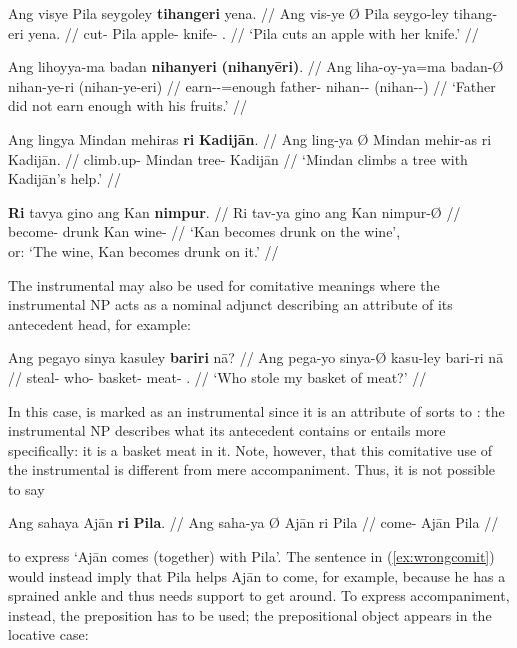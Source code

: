 \pex
\a\begingl
	\gla Ang visye {} Pila seygoley \textbf{tihangeri} yena. //
	\glb Ang vis-ye Ø Pila seygo-ley tihang-eri yena. //
	\glc \AgtT{} cut-\TsgF{} \Top{} Pila apple-\PargI{} 
		knife-\Ins{} \TsgF{}.\Gen{} //
	\glft `Pila cuts an apple with her knife.' //
\endgl

\a\begingl
	\gla Ang lihoyya-ma badan \textbf{nihanyeri} \textbf{(nihanyēri)}. //
	\glb Ang liha-oy-ya=ma badan-Ø nihan-ye-ri (nihan-ye-eri) //
	\glc \AgtT{} earn-\Neg{}-\TsgM{}=enough father-\Top{} 
		nihan-\Pl{}-\Ins{} (nihan-\Pl{}-\Ins) //
	\glft `Father did not earn enough with his fruits.' //
\endgl

\a\begingl
	\gla Ang lingya {} Mindan mehiras \textbf{ri} \textbf{Kadijān}. //
	\glb Ang ling-ya Ø Mindan mehir-as ri Kadijān. //
	\glc \AgtT{} climb.up-\TsgM{} \Top{} Mindan tree-\Parg{} 
		\Ins{} Kadijān //
	\glft `Mindan climbs a tree with Kadijān's help.' //
\endgl

\a\begingl
	\gla \textbf{Ri} tavya gino ang Kan \textbf{nimpur}. //
	\glb Ri tav-ya gino ang Kan nimpur-Ø //
	\glc \InsT{} become-\TsgM{} drunk \Aarg{} Kan wine-\Top{} //
	\glft `Kan becomes drunk on the wine', \\
		or: `The wine, Kan becomes drunk on it.' //
\endgl

\xe

The instrumental may also be used for comitative meanings where the
instrumental NP acts as a nominal adjunct describing an attribute of its
antecedent head, for example:

\ex\begingl
	\gla Ang pegayo sinya kasuley \textbf{bariri} nā? //
	\glb Ang pega-yo sinya-Ø kasu-ley bari-ri nā //
	\glc \AgtT{} steal-\TsgN{} who-\Top{} basket-\PargI{} 
		meat-\Ins{} \Fsg{}.\Gen{} //
	\glft `Who stole my basket of meat?' //
\endgl\xe

In this case,  is marked as an instrumental since it is an
attribute of sorts to : the instrumental NP describes what its
antecedent contains or entails more specifically: it is a basket  meat
in it. Note, however, that this comitative use of the instrumental is different
from mere accompaniment. Thus, it is not possible to say

\ex\label{ex:wrongcomit}\ljudge* \begingl
	\gla Ang sahaya {} Ajān \textbf{ri} \textbf{Pila}. //
	\glb Ang saha-ya Ø Ajān ri Pila //
	\glc \AgtT{} come-\TsgM{} \Top{} Ajān \Ins{} Pila //
\endgl\xe

\noindent to express `Ajān comes (together) with Pila'. The sentence in 
(\ref{ex:wrongcomit}) would instead imply that Pila helps Ajān to come, for 
example, because he has a sprained ankle and thus needs support to get around. 
To express accompaniment, instead, the preposition  has to be used; the prepositional object appears in the locative 
case:

